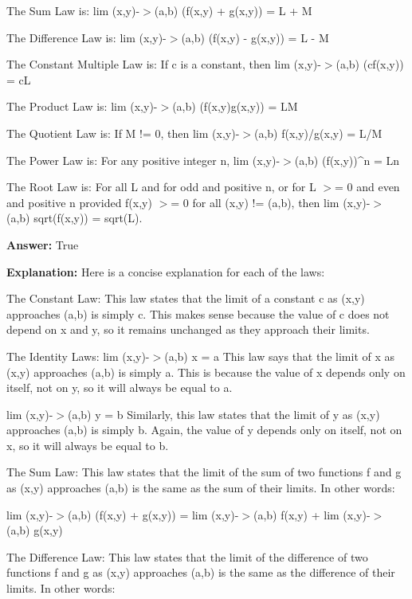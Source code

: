 \documentclass{article}
\begin{document}
The Sum Law is: lim (x,y)-\ensuremath{>}(a,b) (f(x,y) + g(x,y)) = L + M

The Difference Law is: lim (x,y)-\ensuremath{>}(a,b) (f(x,y) - g(x,y)) = L - M

The Constant Multiple Law is: If c is a constant, then lim (x,y)-\ensuremath{>}(a,b) (cf(x,y)) = cL

The Product Law is: lim (x,y)-\ensuremath{>}(a,b) (f(x,y)g(x,y)) = LM

The Quotient Law is: If M != 0, then lim (x,y)-\ensuremath{>}(a,b) f(x,y)/g(x,y) = L/M

The Power Law is: For any positive integer n, lim (x,y)-\ensuremath{>}(a,b) (f(x,y)){\textasciicircum}n = Ln

The Root Law is: For all L and for odd and positive n, or for L \ensuremath{>}= 0 and even and positive n provided f(x,y) \ensuremath{>}= 0 for all (x,y) != (a,b), then lim (x,y)-\ensuremath{>}(a,b) sqrt(f(x,y)) = sqrt(L).
                
                \textbf{Answer:} True

                \textbf{Explanation:} Here is a concise explanation for each of the laws:

The Constant Law: This law states that the limit of a constant c as (x,y) approaches (a,b) is simply c. This makes sense because the value of c does not depend on x and y, so it remains unchanged as they approach their limits.

The Identity Laws:
lim (x,y)-\ensuremath{>}(a,b) x = a
This law says that the limit of x as (x,y) approaches (a,b) is simply a. This is because the value of x depends only on itself, not on y, so it will always be equal to a.

lim (x,y)-\ensuremath{>}(a,b) y = b
Similarly, this law states that the limit of y as (x,y) approaches (a,b) is simply b. Again, the value of y depends only on itself, not on x, so it will always be equal to b.

The Sum Law: This law states that the limit of the sum of two functions f and g as (x,y) approaches (a,b) is the same as the sum of their limits. In other words:

lim (x,y)-\ensuremath{>}(a,b) (f(x,y) + g(x,y)) = lim (x,y)-\ensuremath{>}(a,b) f(x,y) + lim (x,y)-\ensuremath{>}(a,b) g(x,y)

The Difference Law: This law states that the limit of the difference of two functions f and g as (x,y) approaches (a,b) is the same as the difference of their limits. In other words:
\end{document}
